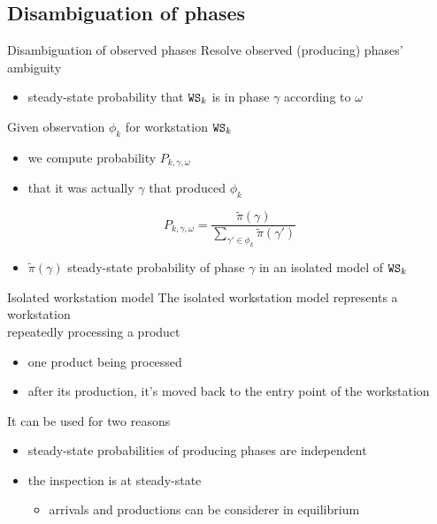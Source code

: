   \subsection{Disambiguation of phases}
    \begin{frame}{Disambiguation of observed phases}
      Resolve observed (producing) phases' ambiguity
      \begin{itemize}
        \item steady-state probability that $\mathtt{WS}_k$ is in phase $\gamma$ according to $\omega$
      \end{itemize}
      Given observation $\phi_k$ for workstation $\mathtt{WS}_k$
      \begin{itemize}
        \item we compute probability $P_{k,\gamma,\omega}$
        \item that it was actually $\gamma$ that produced $\phi_k$
      \end{itemize}
      
     	\begin{equation*}
       	P_{k,\gamma,\omega} = \frac{\tilde{\pi}(\gamma)}{\displaystyle \sum_{\gamma' \in \phi_k} \tilde{\pi}(\gamma')}
       	\label{eq:probabilityObservation}
     	\end{equation*}
     	
     	\begin{itemize}
       	\item $\tilde{\pi}(\gamma)$ steady-state probability of phase $\gamma$ in an isolated model of $\mathtt{WS}_k$
     	\end{itemize}
    \end{frame}
    
    \begin{frame}{Isolated workstation model}
      The isolated workstation model represents a workstation\\
      repeatedly processing a product
      \begin{itemize}
        \item one product being processed
        \item after its production, it's moved back to the entry point of the workstation
      \end{itemize}
      
      \begin{center}\scalebox{0.6}{}\end{center}
      
      It can be used for two reasons
      \begin{itemize}
        \item steady-state probabilities of producing phases are independent
        \item the inspection is at steady-state
        \begin{itemize}
          \item arrivals and productions can be considerer in equilibrium
        \end{itemize}
      \end{itemize}
    \end{frame}
    

